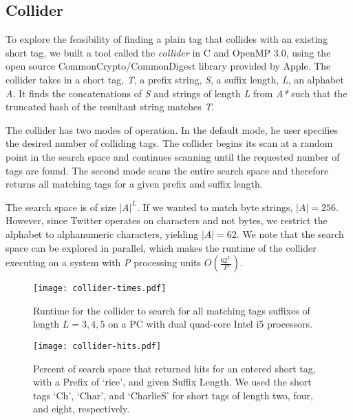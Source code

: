 \subsection{Collider}
\label{sec:collider}

To explore the feasibility of finding a plain tag that collides with an
existing short tag, we built a tool called the {\em collider} in C and
OpenMP 3.0, using the open source CommonCrypto/CommonDigest library provided
by Apple. %
The collider takes in a short tag, \textit{T}, a prefix string,
\textit{S}, a suffix length, \textit{L}, an alphabet \textit{A}. It
finds the concatenations of \textit{S} and strings of length \textit{L}
from \textit{A*} such that the truncated hash of the resultant string
matches \textit{T}.

The collider has two modes of operation. In the default mode, he user
specifies the desired number of colliding tags. The collider begins its
scan at a random point in the search space and continues scanning until
the requested number of tags are found. The second mode scans the entire
search space and therefore returns all matching tags for a given prefix
and suffix length.

The search space is of size $|A|^L$. If we wanted to match byte strings,
$|A| = 256$. However, since Twitter operates on characters and not
bytes, we restrict the alphabet to alphanumeric characters, yielding
$|A| = 62$. We note that the search space can be explored in parallel,
which makes the runtime of the collider executing on a system with
\textit{P} processing units $O(\frac{62^L}{P})$.

\begin{figure}
\begin{center}
\texttt{[image: collider-times.pdf]}
\caption{Runtime for the collider to search for all matching tags
  suffixes of length $L=3,4,5$ on a PC with dual quad-core Intel i5
  processors.
\label{fig:collider-times}
}
\end{center}
\end{figure}

\begin{figure}
\begin{center}
\texttt{[image: collider-hits.pdf]}
\caption{Percent of search space that returned hits for an entered short
  tag, with a Prefix of `rice', and given Suffix Length. We used the
  short tags `Ch', `Char', and `CharlieS' for short tags of length two,
  four, and eight, respectively.
\label{fig:collider-hits}
}
\end{center}
\end{figure}

